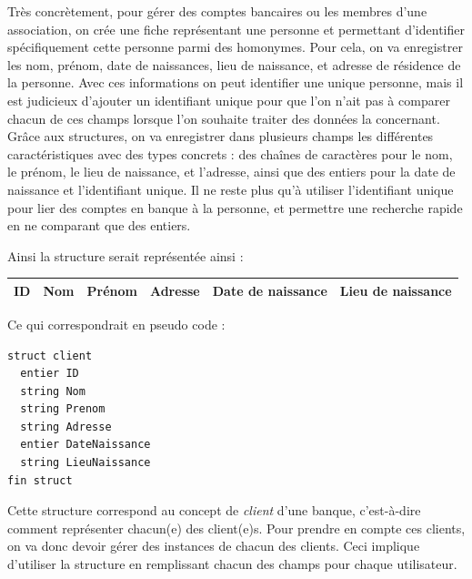 \documentclass[11pt,a4paper]{article}
\begin{document}
Très concrètement, pour gérer des comptes bancaires ou les membres d'une association, on crée une fiche représentant une personne et permettant d'identifier spécifiquement cette personne parmi des homonymes.
Pour cela, on va enregistrer les nom, prénom, date de naissances, lieu de naissance, et adresse de résidence de la personne.
Avec ces informations on peut identifier une unique personne, mais il est judicieux d'ajouter un identifiant unique pour que l'on n'ait pas à comparer chacun de ces champs lorsque l'on souhaite traiter des données la concernant.
Grâce aux structures, on va enregistrer dans plusieurs champs les différentes caractéristiques avec des types concrets : des chaînes de caractères pour le nom, le prénom, le lieu de naissance, et l'adresse, ainsi que des entiers pour la date de naissance et l'identifiant unique.
Il ne reste plus qu'à utiliser l'identifiant unique pour lier des comptes en banque à la personne, et permettre une recherche rapide en ne comparant que des entiers.

\medskip

Ainsi la structure serait représentée ainsi :

\begin{center}
\begin{tabular}{| c | c | c | c | c | c |}
\hline
ID & Nom & Prénom & Adresse & Date de naissance & Lieu de naissance \\
\hline
\end{tabular}
\end{center}

Ce qui correspondrait en pseudo code :

\begin{center}
\begin{lstlisting}[style=algorithmique]
struct client
  entier ID
  string Nom
  string Prenom
  string Adresse
  entier DateNaissance
  string LieuNaissance
fin struct \end{lstlisting}
\end{center}


Cette structure correspond au concept de \textit{client} d'une banque, c'est-à-dire comment représenter chacun(e) des client(e)s.
Pour prendre en compte ces clients, on va donc devoir gérer des instances de chacun des clients.
Ceci implique d'utiliser la structure en remplissant chacun des champs pour chaque utilisateur.
\end{document}
